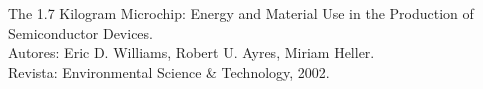 \begin{thebibliography}{9}
The 1.7 Kilogram Microchip: Energy and Material Use in the Production of Semiconductor Devices.\\
Autores: Eric D. Williams, Robert U. Ayres, Miriam Heller.\\
Revista: Environmental Science \& Technology, 2002.\\
\end{thebibliography}